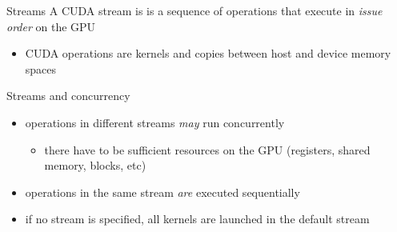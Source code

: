 \begin{frame}[fragile]{}
    \begin{info}{Streams}
        A CUDA stream is is a sequence of operations that execute in \emph{issue order} on the GPU
        \begin{itemize}
            \item CUDA operations are kernels and copies between host and device memory spaces
        \end{itemize}
    \end{info}

    \begin{info}{Streams and concurrency}
        \begin{itemize}
            \item operations in different streams \emph{may} run concurrently
            \begin{itemize}
                \item there have to be sufficient resources on the GPU (registers, shared memory, blocks, etc)
            \end{itemize}
            \item operations in the same stream \emph{are} executed sequentially
            \item if no stream is specified, all kernels are launched in the default stream
        \end{itemize}
    \end{info}

\end{frame}


